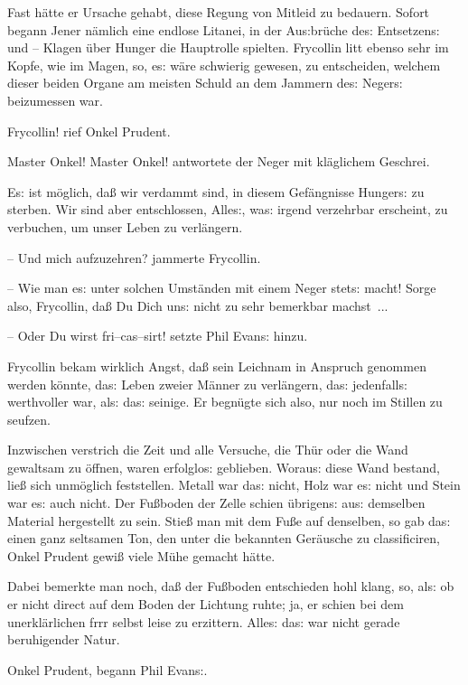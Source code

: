 \documentclass[oneside,12pt]{book}
\newcommand{\s}{s:}
\begin{document}
Fast h\"atte er Ursache gehabt, diese Regung von Mitleid zu bedauern.
Sofort begann Jener n\"amlich eine endlose Litanei, in der Au{\s}br\"uche
de{\s} Entsetzen{\s} und -- Klagen \"uber Hunger die Hauptrolle
spielten. Frycollin litt ebenso sehr im Kopfe, wie im Magen, so,
e{\s} w\"are schwierig gewesen, zu entscheiden, welchem dieser beiden
Organe am meisten Schuld an dem Jammern de{\s} Neger{\s} beizumessen war.

{\glqq}Frycollin!{\grqq} rief Onkel Prudent.

{\glqq}Master Onkel! Master Onkel!{\grqq} antwortete der Neger mit
kl\"aglichem Geschrei.

{\glqq}E{\s} ist m\"oglich, da{\ss} wir verdammt sind, in diesem
Gef\"angnisse Hunger{\s} zu sterben. Wir sind aber entschlossen,
Alle{\s}, wa{\s} irgend verzehrbar erscheint, zu verbuchen, um unser
Leben zu verl\"angern.

-- Und mich aufzuzehren? jammerte Frycollin.

-- Wie man e{\s} unter solchen Umst\"anden mit einem Neger stet{\s}
macht! Sorge also, Frycollin, da{\ss} Du Dich un{\s} nicht zu sehr
bemerkbar machst~...

-- Oder Du wirst fri--cas--sirt!{\grqq} setzte Phil Evan{\s} hinzu.

Frycollin bekam wirklich Angst, da{\ss} sein Leichnam in Anspruch
genommen werden k\"onnte, da{\s} Leben zweier M\"anner zu
verl\"angern, da{\s} jedenfall{\s} werthvoller war, al{\s} da{\s}
seinige. Er begn\"ugte sich also, nur noch im Stillen zu seufzen.

Inzwischen verstrich die Zeit und alle Versuche, die Th\"ur oder die
Wand gewaltsam zu \"offnen, waren erfolglo{\s} geblieben. Worau{\s}
diese Wand bestand, lie{\ss} sich unm\"oglich feststellen. Metall war
da{\s} nicht, Holz war e{\s} nicht und Stein war e{\s} auch nicht.
Der Fu{\ss}boden der Zelle schien \"ubrigen{\s} au{\s} demselben
Material hergestellt zu sein. Stie{\ss} man mit dem Fu{\ss}e auf
denselben, so gab da{\s} einen ganz seltsamen Ton, den unter die
bekannten Ger\"ausche zu classificiren, Onkel Prudent gewi{\ss} viele
M\"uhe gemacht h\"atte.

Dabei bemerkte man noch, da{\ss} der Fu{\ss}boden entschieden hohl
klang, so, al{\s} ob er nicht direct auf dem Boden der Lichtung
ruhte; ja, er schien bei dem unerkl\"arlichen frrr selbst leise zu
erzittern. Alle{\s} da{\s} war nicht gerade beruhigender Natur.

{\glqq}Onkel Prudent, begann Phil Evan{\s}.
\end{document}
